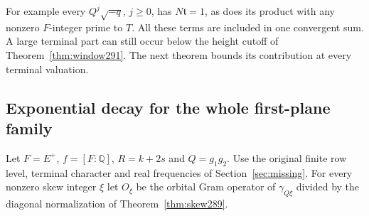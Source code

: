 \documentclass[a4paper,11pt]{article}
\theoremstyle{definition}
\theoremstyle{remark}
\numberwithin{equation}{section}
\begin{document}
For example every \(Q^j\sqrt{-q}\), \(j\ge0\), has
\(N\mathfrak t=1\), as does its product with any
nonzero \(F\)-integer prime to \(T\). All these terms
are included in one convergent sum. A large terminal
part can still occur below the height cutoff of
Theorem~\ref{thm:window291}. The next theorem bounds its contribution at every terminal valuation.

\subsection{Exponential decay for the whole first-plane family}\label{nav:IX-56}
Let \(F=E^+\), \(f=[F:\mathbb Q]\), \(R=k+2s\) and
\(Q=g_1g_2\). Use the original finite row level, terminal
character and real frequencies of Section~\ref{sec:missing}. For every
nonzero skew integer \(\xi\) let \(O_\xi\) be the orbital
Gram operator of \(\gamma_{Q\xi}\) divided by the
diagonal normalization of Theorem~\ref{thm:skew289}.
\end{document}
